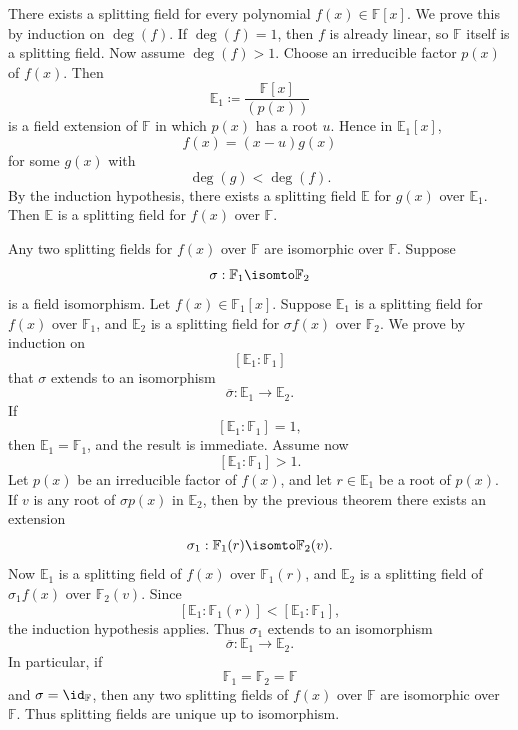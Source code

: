 \begin{theorem}{
    There exists a splitting field for every polynomial $f(x)\in \mathbb{F}[x]$.
}
We prove this by induction on $\deg(f)$.
If $\deg(f)=1$, then $f$ is already linear, so $\mathbb{F}$ itself is a splitting field.
Now assume $\deg(f)>1$.
Choose an irreducible factor $p(x)$ of $f(x)$.
Then
\[
    \mathbb{E}_1\coloneqq \frac{\mathbb{F}[x]}{(p(x))}
\]
is a field extension of $\mathbb{F}$ in which $p(x)$ has a root $u$.
Hence in $\mathbb{E}_1[x]$,
\[
    f(x)=(x-u)g(x)
\]
for some $g(x)$ with
\[
    \deg(g)<\deg(f).
\]
By the induction hypothesis, there exists a splitting field $\mathbb{E}$ for $g(x)$ over $\mathbb{E}_1$.
Then $\mathbb{E}$ is a splitting field for $f(x)$ over $\mathbb{F}$.
\end{theorem}

\begin{theorem}{
    Any two splitting fields for $f(x)$ over $\mathbb{F}$ are isomorphic over $\mathbb{F}$.
}
Suppose
\[
    \sigma:\mathbb{F}_1\isomto \mathbb{F}_2
\]
is a field isomorphism.
Let $f(x)\in \mathbb{F}_1[x]$.
Suppose $\mathbb{E}_1$ is a splitting field for $f(x)$ over $\mathbb{F}_1$, and $\mathbb{E}_2$ is a splitting field for $\sigma f(x)$ over $\mathbb{F}_2$.
We prove by induction on
\[
    [\mathbb{E}_1:\mathbb{F}_1]
\]
that $\sigma$ extends to an isomorphism
\[
    \overline{\sigma}:\mathbb{E}_1\to \mathbb{E}_2.
\]
If
\[
    [\mathbb{E}_1:\mathbb{F}_1]=1,
\]
then $\mathbb{E}_1=\mathbb{F}_1$, and the result is immediate.
Assume now
\[
    [\mathbb{E}_1:\mathbb{F}_1]>1.
\]
Let $p(x)$ be an irreducible factor of $f(x)$, and let $r\in \mathbb{E}_1$ be a root of $p(x)$.
If $v$ is any root of $\sigma p(x)$ in $\mathbb{E}_2$, then by the previous theorem there exists an extension
\[
    \sigma_1:\mathbb{F}_1(r)\isomto \mathbb{F}_2(v).
\]
Now $\mathbb{E}_1$ is a splitting field of $f(x)$ over $\mathbb{F}_1(r)$, and $\mathbb{E}_2$ is a splitting field of $\sigma_1 f(x)$ over $\mathbb{F}_2(v)$.
Since
\[
    [\mathbb{E}_1:\mathbb{F}_1(r)]<[\mathbb{E}_1:\mathbb{F}_1],
\]
the induction hypothesis applies.
Thus $\sigma_1$ extends to an isomorphism
\[
    \overline{\sigma}:\mathbb{E}_1\to \mathbb{E}_2.
\]
In particular, if
\[
    \mathbb{F}_1=\mathbb{F}_2=\mathbb{F}
\]
and $\sigma=\id_{\mathbb{F}}$, then any two splitting fields of $f(x)$ over $\mathbb{F}$ are isomorphic over $\mathbb{F}$.
Thus splitting fields are unique up to isomorphism.
\end{theorem}